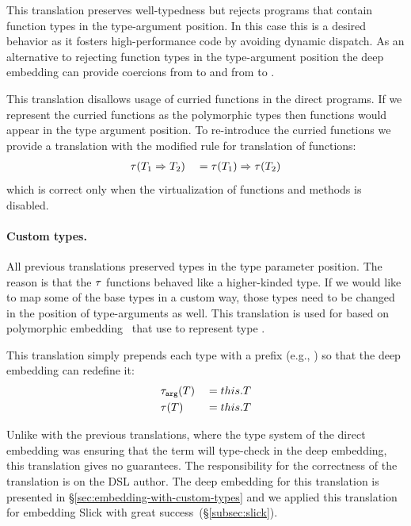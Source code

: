 This translation preserves well-typedness but rejects programs that contain
function types in the type-argument position. In this case this is a desired
behavior as it fosters high-performance code by avoiding dynamic dispatch. As an alternative to rejecting function types in the type-argument position the deep embedding can provide
coercions from  to  and from  to .

This translation disallows usage of curried functions in the direct programs. If we
represent the curried functions as the polymorphic types then
functions would appear in the type argument position. To re-introduce the curried functions we
provide a translation with the modified rule for translation of functions:
\begin{alignat*}{3}
&\ttother[T_1 \Rightarrow T_2] & \; = \; & \ttother[T_1] \Rightarrow \ttother[T_2]\\
\end{alignat*} %
which is correct only when the virtualization of functions and methods is disabled.

\paragraph{Custom types.} All previous translations preserved types in the type parameter position. The reason is that the $\tau$ functions behaved like a higher-kinded type. If we would like to map some of the base types in a custom way, those types need to be changed in the position of type-arguments as well. This translation is used for \edsls based on polymorphic embedding~\cite{hofer_polymorphic_2008} that use  to represent type .

This translation simply prepends each type with a prefix (e.g., ) so that
the deep embedding can redefine it:
\begin{alignat*}{3}
&\ttarg[T] & \; = \; & this.T\\
&\ttother[T] & \; = \; & this.T\\
\end{alignat*}

Unlike with the previous translations, where the type system of the direct embedding was
ensuring that the term will type-check in the deep embedding, this translation gives no guarantees. The
responsibility for the correctness of the translation is on the DSL author. The deep embedding
for this translation is presented in \S \ref{sec:embedding-with-custom-types} and we applied
this translation for embedding Slick \cite{slick} with great success~(\S \ref{subsec:slick}).

